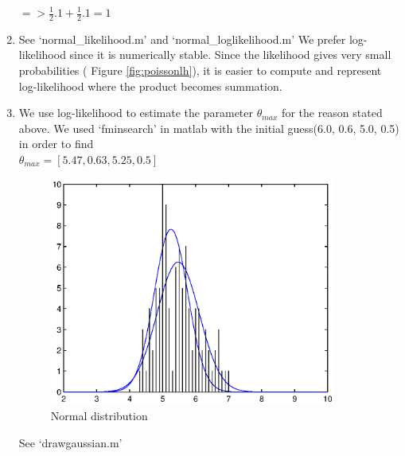 \documentclass[a4paper]{article}
\begin{document}
\begin{enumerate}
	 $ => \frac{1}{2}.1 + \frac{1}{2}.1 = 1 $
	 
	 \item See `normal\_likelihood.m' and `normal\_loglikelihood.m' \newline
	 We prefer log-likelihood since it is numerically stable. Since the likelihood gives very small probabilities ( Figure \ref{fig:poissonlh}), it is easier to compute and represent log-likelihood where the product becomes summation.
	 
	 \item We use log-likelihood to estimate the parameter $\theta_{max}$ for the reason stated above. We used `fminsearch' in matlab with the initial guess(6.0, 0.6, 5.0, 0.5) in order to find  \\
	 $\theta_{max} = [5.47, 0.63, 5.25, 0.5]$ 
	 
	 	\begin{figure}[H]
	 		\begin{center}
	 			\includegraphics[width=0.89\textwidth]{normal_distributions.eps}
	 			\caption{ Normal distribution} \label{fig:normdist}
	 		\end{center}
	 	\end{figure}
	 
	 See `drawgaussian.m'
	 
\end{enumerate}
\end{document}
